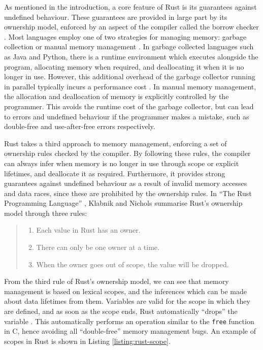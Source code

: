 As mentioned in the introduction, a core feature of Rust is its guarantees against undefined behaviour. These guarantees are provided in large part by its ownership model, enforced by an aspect of the compiler called the borrow checker \cite{ReferencesBorrowing}. Most languages employ one of two strategies for managing memory: garbage collection or manual memory management \cite{hertzQuantifyingPerformanceGarbage2005}. In garbage collected languages such as Java and Python, there is a runtime environment which executes alongside the program, allocating memory when required, and deallocating it when it is no longer in use. However, this additional overhead of the garbage collector running in parallel typically incurs a performance cost  \cite{hertzQuantifyingPerformanceGarbage2005}. In manual memory management, the allocation and deallocation of memory is explicitly controlled by the programmer. This avoids the runtime cost of the garbage collector, but can lead to errors and undefined behaviour if the programmer makes a mistake, such as double-free and use-after-free errors respectively.

Rust takes a third approach to memory management, enforcing a set of ownership rules checked by the compiler. By following these rules, the compiler can always infer when memory is no longer in use through scope or explicit lifetimes, and deallocate it as required. Furthermore, it provides strong guarantees against undefined behaviour as a result of invalid memory accesses and data races, since these are prohibited by the ownership rules. In ``The Rust Programming Language'' \cite{RustProgrammingLanguage}, Klabnik and Nichols summarise Rust's ownership model through three rules:

\begin{quote}
    \begin{enumerate}
        \item Each value in Rust has an owner.
        \item There can only be one owner at a time.
        \item When the owner goes out of scope, the value will be dropped.
    \end{enumerate}
\end{quote}

From the third rule of Rust's ownership model, we can see that memory management is based on lexical scopes, and the inferences which can be made about data lifetimes from them. Variables are valid for the scope in which they are defined, and as soon as the scope ends, Rust automatically ``drops'' the variable \cite{sautterOBSERVINGPARALLELEXECUTION}. This automatically performs an operation similar to the \texttt{free} function in C, hence avoiding all ``double-free'' memory management bugs. An example of scopes in Rust is shown in Listing \ref{listing:rust-scope}.

